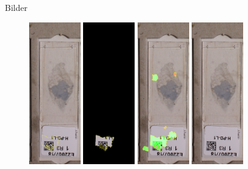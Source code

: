 \documentclass{beamer}
\begin{document}
  \begin{frame}{Bilder}
    \begin{figure}
      \includegraphics[width=0.2\textwidth]{./assets/Cell101453_2_4_top2_positiveonlywithrest.PNG}
      \hfill
      \includegraphics[width=0.2\textwidth]{./assets/Cell101453_2_4_top2_positiveonly.PNG}
      \hfill
      \includegraphics[width=0.2\textwidth]{./assets/Cell101453_2_4_top2_proscons.PNG}
      \hfill
      \includegraphics[width=0.2\textwidth]{./assets/Cell101453_2_4_top2_prosconsminweight.PNG}

\end{figure}
\end{frame}
\end{document}
